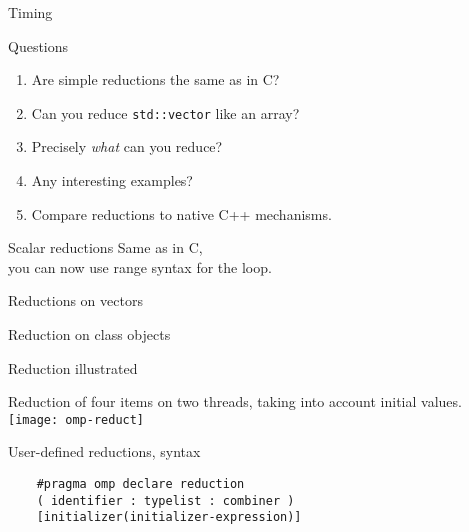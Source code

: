 \documentclass[11pt,headernav]{beamer}
\begin{document}
\begin{numberedframe}{Timing}
  
\end{numberedframe}


\begin{numberedframe}{Questions}
  \begin{enumerate}
  \item Are simple reductions the same as in C?
  \item Can you reduce \lstinline{std::vector} like an array?
  \item Precisely \emph{what} can you reduce?
  \item Any interesting examples?
  \item Compare reductions to native C++ mechanisms.
  \end{enumerate}
\end{numberedframe}

\begin{numberedframe}{Scalar reductions}
  Same as in C,\\
  you can now use range syntax for the loop.
\end{numberedframe}

\begin{numberedframe}{Reductions on vectors}
  
\end{numberedframe}

\begin{numberedframe}{Reduction on class objects}
  \footnotesize
  
\end{numberedframe}

\begin{numberedframe}{Reduction illustrated}
  \label{fig:omp-reduct}

  Reduction of four items on two threads, taking into account
  initial values.
  \texttt{[image: omp-reduct]}
\end{numberedframe}

\begin{numberedframe}{User-defined reductions, syntax}
  \begin{lstlisting}
    #pragma omp declare reduction 
    ( identifier : typelist : combiner )
    [initializer(initializer-expression)]
  \end{lstlisting}
\end{numberedframe}
\end{document}
